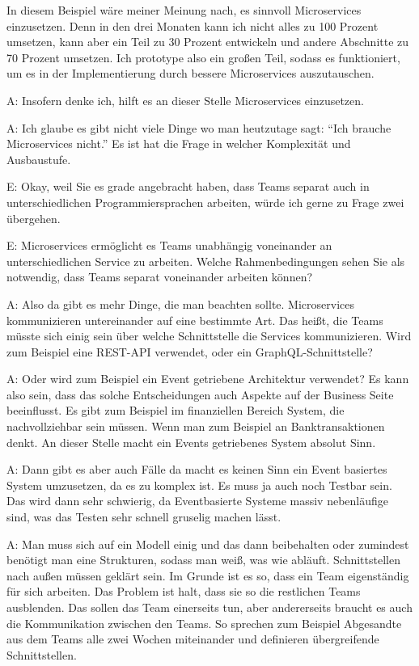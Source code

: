 In diesem Beispiel wäre meiner Meinung nach, es sinnvoll Microservices einzusetzen. Denn in den drei Monaten kann ich nicht alles zu 100 Prozent umsetzen, kann aber ein Teil zu 30 Prozent entwickeln und andere Abschnitte zu 70 Prozent umsetzen. Ich prototype also ein großen Teil, sodass es funktioniert, um es in der Implementierung durch bessere Microservices auszutauschen. 

A: Insofern denke ich, hilft es an dieser Stelle Microservices einzusetzen.

A: Ich glaube es gibt nicht viele Dinge wo man heutzutage sagt: “Ich brauche Microservices nicht.” Es ist hat die Frage in welcher Komplexität und Ausbaustufe.

E: Okay, weil Sie es grade angebracht haben, dass Teams separat auch in unterschiedlichen Programmiersprachen arbeiten, würde ich gerne zu Frage zwei übergehen.

E: Microservices ermöglicht es Teams unabhängig voneinander an unterschiedlichen Service zu arbeiten. Welche Rahmenbedingungen sehen Sie als notwendig, dass Teams separat voneinander arbeiten können?

A: Also da gibt es mehr Dinge, die man beachten sollte. Microservices kommunizieren untereinander auf eine bestimmte Art. Das heißt, die Teams müsste sich einig sein über welche Schnittstelle die Services kommunizieren. Wird zum Beispiel eine REST-API verwendet, oder ein GraphQL-Schnittstelle?
 
A: Oder wird zum Beispiel ein Event getriebene Architektur verwendet? Es kann also sein, dass das solche Entscheidungen auch Aspekte auf der Business Seite beeinflusst. Es gibt zum Beispiel im finanziellen Bereich System, die nachvollziehbar sein müssen. Wenn man zum Beispiel an Banktransaktionen denkt. An dieser Stelle macht ein Events getriebenes System absolut Sinn.

A: Dann gibt es aber auch Fälle da macht es keinen Sinn ein Event basiertes System umzusetzen, da es zu komplex ist. Es muss ja auch noch Testbar sein. Das wird dann sehr schwierig, da Eventbasierte Systeme massiv nebenläufige sind, was das Testen sehr schnell gruselig machen lässt.

A: Man muss sich auf ein Modell einig und das dann beibehalten oder zumindest benötigt man eine Strukturen, sodass man weiß, was wie abläuft. Schnittstellen nach außen müssen geklärt sein. Im Grunde ist es so, dass ein Team eigenständig für sich arbeiten. Das Problem ist halt, dass sie so die restlichen Teams ausblenden. Das sollen das Team einerseits tun, aber andererseits braucht es auch die Kommunikation zwischen den Teams. So sprechen zum Beispiel Abgesandte aus dem Teams alle zwei Wochen miteinander und definieren übergreifende Schnittstellen.

